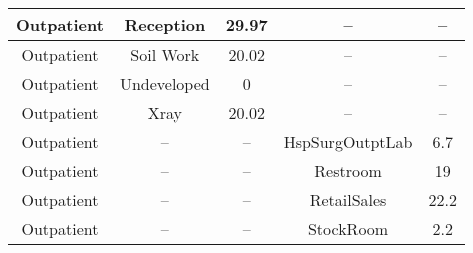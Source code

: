 \begin{table}
\begin{tabular}{|c|c|c|c|c|}
Outpatient             & Reception               & 29.97                                                                                                         & --                                & --                                                                                                             \\ \hline
Outpatient             & Soil Work               & 20.02                                                                                                         & --                                & --                                                                                                             \\ \hline
Outpatient             & Undeveloped             & 0                                                                                                             & --                                & --                                                                                                             \\ \hline
Outpatient             & Xray                    & 20.02                                                                                                         & --                                & --                                                                                                             \\ \hline
Outpatient             & --                      & --                                                                                                            & HspSurgOutptLab                   & 6.7                                                                                                            \\ \hline
Outpatient             & --                      & --                                                                                                            & Restroom                          & 19                                                                                                             \\ \hline
Outpatient             & --                      & --                                                                                                            & RetailSales                       & 22.2                                                                                                           \\ \hline
Outpatient             & --                      & --                                                                                                            & StockRoom                         & 2.2                                                                                                            \\ \hline

\end{tabular}
\end{table}
